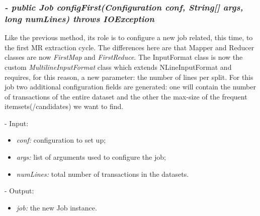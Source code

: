 \documentclass[]{report}
\begin{document}
	\subsubsection*{\textit{\textbf{-} 	public Job configFirst(Configuration conf, String[] args, long numLines) throws IOException}}   	
	Like the previous method, its role is to configure a new job related, this time, to the first MR extraction cycle. The differences here are that Mapper and Reducer classes are now \textit{FirstMap} and \textit{FirstReduce}.  The InputFormat class is now the custom \textit{MultilineInputFormat} class which extends NLineInputFormat and requires, for this reason, a new parameter: the number of lines per split. For this job two additional configuration fields are generated: one will contain the number of transactions of the entire dataset and the other the max-size of the frequent itemsets(/candidates) we want to find.
	\begin{description}
		\item - Input:
		\begin{itemize}
			\item \textit{conf:} configuration to set up;
			\item \textit{args:} list of arguments used to configure the job;
			\item \textit{numLines:} total number of transactions in the datasets.
		\end{itemize}
	\end{description}
	\begin{description}
		\item - Output:
		\begin{itemize}
			\item \textit{job:} the new Job instance. 
		\end{itemize}
	\end{description}	
	
\end{document}

